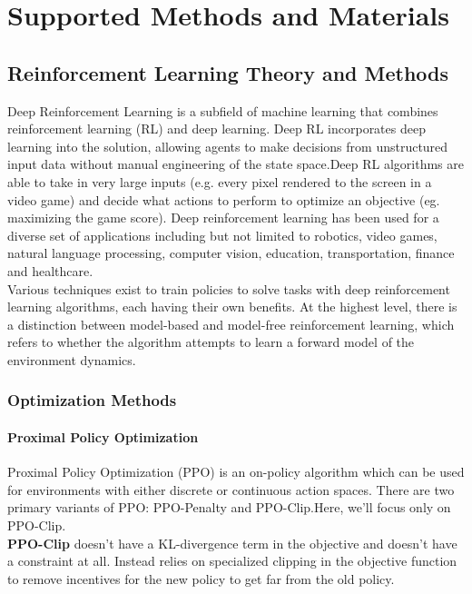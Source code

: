 
\chapter{Supported Methods and Materials} %

\label{Chapter2} %

\setlength{\parindent}{0pt}

\section{Reinforcement Learning Theory and Methods}
Deep Reinforcement Learning is a subfield of machine learning that combines reinforcement learning (RL) and deep learning. Deep RL incorporates deep learning into the solution, allowing agents to make decisions from unstructured input data without manual engineering of the state space.Deep RL algorithms are able to take in very large inputs (e.g. every pixel rendered to the screen in a video game) and decide what actions to perform to optimize an objective (eg. maximizing the game score). Deep reinforcement learning has been used for a diverse set of applications including but not limited to robotics, video games, natural language processing, computer vision, education, transportation, finance and healthcare. \\
Various techniques exist to train policies to solve tasks with deep reinforcement learning algorithms, each having their own benefits. At the highest level, there is a distinction between model-based and model-free reinforcement learning, which refers to whether the algorithm attempts to learn a forward model of the environment dynamics.
\subsection{Optimization Methods}
\subsubsection{Proximal Policy Optimization}
Proximal Policy Optimization (PPO) is an on-policy algorithm which can be used for environments with either discrete or continuous action spaces. There are two primary variants of PPO: PPO-Penalty and PPO-Clip.Here, we’ll focus only on PPO-Clip.\\
\textbf{PPO-Clip} doesn’t have a KL-divergence term in the objective and doesn’t have a constraint at all. Instead relies on specialized clipping in the objective function to remove incentives for the new policy to get far from the old policy.\\

